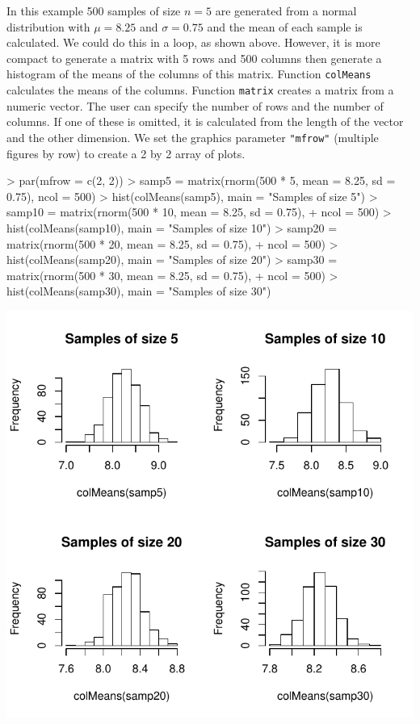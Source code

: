 \documentclass{book}
\begin{document}
In this example 500 samples of size $n=5$ are generated from a normal
distribution with $\mu=8.25$ and $\sigma=0.75$ and the mean of each
sample is calculated.  We could do this in a loop, as shown above.
However, it is more compact to generate a matrix with 5 rows and 500
columns then generate a histogram of the means of the columns of this
matrix.  Function \texttt{colMeans} calculates the means of the
columns.  Function \texttt{matrix} creates a matrix from a numeric
vector.  The user can specify the number of rows and the number of
columns.  If one of these is omitted, it is calculated from the length
of the vector and the other dimension.  We set the graphics parameter
\texttt{"mfrow"} (multiple figures by row) to create a 2 by 2 array of
plots.
\begin{Schunk}
\begin{Sinput}
> par(mfrow = c(2, 2))
> samp5 = matrix(rnorm(500 * 5, mean = 8.25, sd = 0.75), ncol = 500)
> hist(colMeans(samp5), main = "Samples of size 5")
> samp10 = matrix(rnorm(500 * 10, mean = 8.25, sd = 0.75), 
+     ncol = 500)
> hist(colMeans(samp10), main = "Samples of size 10")
> samp20 = matrix(rnorm(500 * 20, mean = 8.25, sd = 0.75), 
+     ncol = 500)
> hist(colMeans(samp20), main = "Samples of size 20")
> samp30 = matrix(rnorm(500 * 30, mean = 8.25, sd = 0.75), 
+     ncol = 500)
> hist(colMeans(samp30), main = "Samples of size 30")
\end{Sinput}
\end{Schunk}
\includegraphics{Devore6-xmp0522a}
\end{document}
